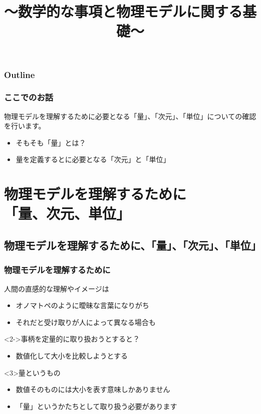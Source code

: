 \documentclass[unicode,12pt,aspectratio=169]{beamer}
\title{～数学的な事項と物理モデルに関する基礎～}
\date{}
\begin{document}
\maketitle

\begin{frame}
\frametitle{Outline}
\tableofcontents
\end{frame}

\begin{frame}
	\frametitle{ここでのお話}
		物理モデルを理解するために必要となる「量」、「次元」、「単位」についての確認を行います。
			\begin{itemize}
				\item そもそも「量」とは？
				\item 量を定義するとに必要となる「次元」と「単位」
			\end{itemize} 
\end{frame}

\section{物理モデルを理解するために\\「量、次元、単位」}
\subsection{物理モデルを理解するために、「量」、「次元」、「単位」}
\begin{frame}
\frametitle{物理モデルを理解するために}
	\begin{block}{人間の直感的な理解やイメージは}
		\begin{itemize}
			\item オノマトペのように曖昧な言葉になりがち
			\item それだと受け取りが人によって異なる場合も
		\end{itemize}
	\end{block}
	
	\begin{block}<2->{事柄を定量的に取り扱おうとすると？}
		\begin{itemize}
			\item 数値化して大小を比較しようとする
		\end{itemize}
	\end{block}

	\begin{alertblock}{量というもの}
		\begin{itemize}
			\item 数値そのものには大小を表す意味しかありません
			\item 「量」というかたちとして取り扱う必要があります
		\end{itemize}
	\end{alertblock}
\end{frame}
\end{document}
